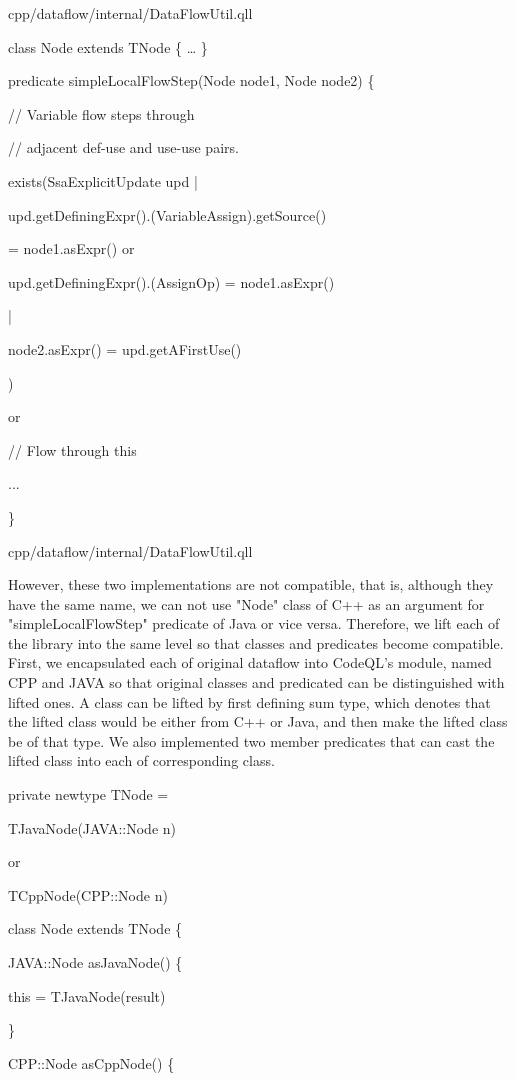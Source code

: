 cpp/dataflow/internal/DataFlowUtil.qll

class Node extends TNode \{
   …
\}

predicate simpleLocalFlowStep(Node node1, Node node2) \{

  // Variable flow steps through
  
  // adjacent def-use and use-use pairs.
  
  exists(SsaExplicitUpdate upd |
  
    upd.getDefiningExpr().(VariableAssign).getSource()
    
    = node1.asExpr() or
    
    upd.getDefiningExpr().(AssignOp) = node1.asExpr()
  
  |
  
    node2.asExpr() = upd.getAFirstUse()
  
  )
  
  or
  
  // Flow through this
  
  ...

\}

cpp/dataflow/internal/DataFlowUtil.qll

However, these two implementations are not compatible, that is, although they have the same name,
we can not use "Node" class of C++ as an argument for "simpleLocalFlowStep" predicate of Java or vice versa.
Therefore, we lift each of the library into the same level so that classes and predicates become compatible.
First, we encapsulated each of original dataflow into CodeQL's module, named CPP and JAVA so that
original classes and predicated can be distinguished with lifted ones.
A class can be lifted by first defining sum type, which denotes that the lifted class would be either from C++ or
Java, and then make the lifted class be of that type. We also implemented two member predicates that can cast
the lifted class into each of corresponding class.

private newtype TNode =

  TJavaNode(JAVA::Node n)
  
  or
  
  TCppNode(CPP::Node n)

class Node extends TNode \{
  
  JAVA::Node asJavaNode() \{
    
    this = TJavaNode(result)
  
  \}
  
  CPP::Node asCppNode() \{
    
